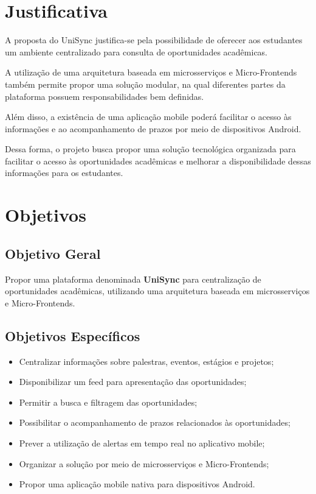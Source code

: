 \documentclass[12pt,oneside,a4paper,chapter=TITLE]{abntex2}
\begin{document}
\chapter{Justificativa}

A proposta do UniSync justifica-se pela possibilidade de oferecer aos
estudantes um ambiente centralizado para consulta de oportunidades
acadêmicas.

A utilização de uma arquitetura baseada em microsserviços e
Micro-Frontends também permite propor uma solução modular, na qual
diferentes partes da plataforma possuem responsabilidades bem
definidas.

Além disso, a existência de uma aplicação mobile poderá facilitar o
acesso às informações e ao acompanhamento de prazos por meio de
dispositivos Android.

Dessa forma, o projeto busca propor uma solução tecnológica organizada
para facilitar o acesso às oportunidades acadêmicas e melhorar a
disponibilidade dessas informações para os estudantes.

\chapter{Objetivos}

\section{Objetivo Geral}

Propor uma plataforma denominada \textbf{UniSync} para centralização de
oportunidades acadêmicas, utilizando uma arquitetura baseada em
microsserviços e Micro-Frontends.

\section{Objetivos Específicos}

\begin{itemize}
    \item Centralizar informações sobre palestras, eventos, estágios e
    projetos;

    \item Disponibilizar um feed para apresentação das oportunidades;

    \item Permitir a busca e filtragem das oportunidades;

    \item Possibilitar o acompanhamento de prazos relacionados às
    oportunidades;

    \item Prever a utilização de alertas em tempo real no aplicativo
    mobile;

    \item Organizar a solução por meio de microsserviços e
    Micro-Frontends;

    \item Propor uma aplicação mobile nativa para dispositivos Android.
\end{itemize}
\end{document}

